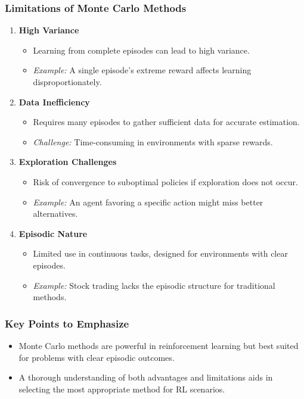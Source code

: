 \documentclass[aspectratio=169]{beamer}
\begin{document}
\begin{frame}[fragile]
    \frametitle{Limitations of Monte Carlo Methods}
    \begin{enumerate}
        \item \textbf{High Variance}
        \begin{itemize}
            \item Learning from complete episodes can lead to high variance.
            \item \textit{Example:} A single episode's extreme reward affects learning disproportionately.
        \end{itemize}
        
        \item \textbf{Data Inefficiency}
        \begin{itemize}
            \item Requires many episodes to gather sufficient data for accurate estimation.
            \item \textit{Challenge:} Time-consuming in environments with sparse rewards.
        \end{itemize}
        
        \item \textbf{Exploration Challenges}
        \begin{itemize}
            \item Risk of convergence to suboptimal policies if exploration does not occur.
            \item \textit{Example:} An agent favoring a specific action might miss better alternatives.
        \end{itemize}
        
        \item \textbf{Episodic Nature}
        \begin{itemize}
            \item Limited use in continuous tasks, designed for environments with clear episodes.
            \item \textit{Example:} Stock trading lacks the episodic structure for traditional methods.
        \end{itemize}
    \end{enumerate}
\end{frame}

\begin{frame}[fragile]
    \frametitle{Key Points to Emphasize}
    \begin{itemize}
        \item Monte Carlo methods are powerful in reinforcement learning but best suited for problems with clear episodic outcomes.
        \item A thorough understanding of both advantages and limitations aids in selecting the most appropriate method for RL scenarios.
    \end{itemize}
\end{frame}
\end{document}
